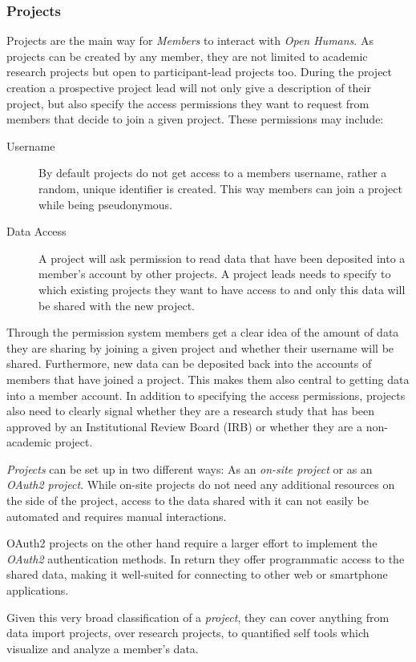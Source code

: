 \documentclass[a4paper,num-refs]{oup-contemporary}
\begin{document}
\subsubsection{Projects}
Projects are the main way for \textit{Members} to interact with \textit{Open Humans}. As projects can be created by any member, they are not limited to academic research projects but open to participant-lead projects too. During the project creation a prospective project lead will not only give a description of their project, but also specify the access permissions they want to request from members that decide to join a given project. These permissions may include: 
\begin{description}
\item [Username] By default projects do not get access to a members username, rather a random, unique identifier is created. This way members can join a project while being pseudonymous. 
\item [Data Access] A project will ask permission to read data that have been deposited into a member's account by other projects. A project leads needs to specify to which existing projects they want to have access to and only this data will be shared with the new project.
\end{description}

Through the permission system members get a clear idea of the amount of data they are sharing by joining a given project and whether their username will be shared. Furthermore, new data can be deposited back into the accounts of members that have joined a project. This makes them also central to getting data into a member account. In addition to specifying the access permissions, projects also need to clearly signal whether they are a research study that has been approved by an Institutional Review Board (IRB) or whether they are a non-academic project.

\textit{Projects} can be set up in two different ways: As an \textit{on-site project} or as an \textit{OAuth2 project}. While on-site projects do not need any additional resources on the side of the project, access to the data shared with it can not easily be automated and requires manual interactions.

OAuth2 projects on the other hand require a larger effort to implement the \textit{OAuth2} authentication methods. In return they offer programmatic access to the shared data, making it well-suited for connecting to other web or smartphone applications.

Given this very broad classification of a \textit{project}, they can cover anything from data import projects, over research projects, to quantified self tools which visualize and analyze a member's data. 
\end{document}
